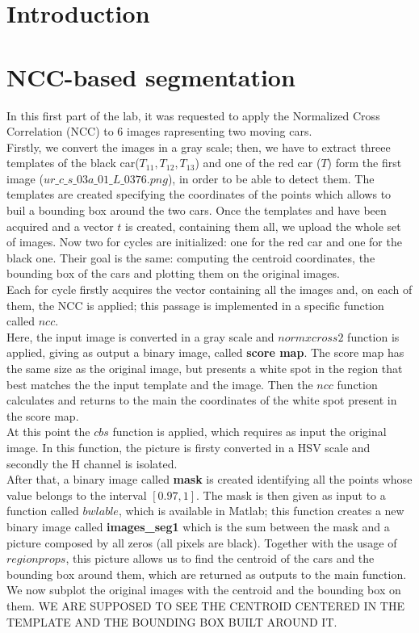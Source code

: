 \chapter*{Introduction}

\chapter{NCC-based segmentation}

In this first part of the lab, it was requested to apply the Normalized Cross Correlation (NCC) to 6 images rapresenting two moving cars.\\
Firstly, we convert the images in a gray scale; then, we have to extract threee templates of the black car($T_{11}, T_{12}, T_{13}$) and one of the red car ($T$) form 
the first image ($ur\_c\_s\_03a\_01\_L\_0376.png$), in order to be able to detect them.
The templates are created specifying the coordinates of the points which allows to buil a bounding box around the two cars. Once the templates and have been acquired and a vector 
$t$ is created, containing them all, we upload the whole set of images.
Now two for cycles are initialized: one for the red car and one for the black one. Their goal is the same: computing the centroid coordinates, the bounding box of the cars
and plotting them on the original images.\\
Each for cycle firstly acquires the vector containing all the images and, on each of them, the NCC is applied; this passage is implemented in a specific function called $ncc$.\\ 
Here, the input image is converted in a gray scale and $normxcross2$ function is applied, giving as output a binary image, called \textbf{score map}. 
The score map has the same size as the original image, but presents a white spot in the region that best matches the the input template and the image.
Then the $ncc$ function calculates and returns to the main the coordinates of the white spot present in the score map.\\
At this point the $cbs$ function is applied, which requires as input the original image. In this function, the picture is firsty converted in a HSV scale and
secondly the H channel is isolated.\\
After that, a binary image called \textbf{mask} is created identifying all the points whose value belongs to the interval $[0.97, 1]$.
The mask is then given as input to a function called $bwlable$, which is available in Matlab; this function creates a new binary image called \textbf{images\_seg1} which is the sum 
between the mask and a picture composed by all zeros (all pixels are black). Together with the usage of $regionprops$, this picture allows us to find the centroid of the cars 
and the bounding box around them, which are returned as outputs to the main function.\\
We now subplot the original images with the centroid and the bounding box on them. 
WE ARE SUPPOSED TO SEE THE CENTROID CENTERED IN THE TEMPLATE AND THE BOUNDING BOX BUILT AROUND IT.\\

